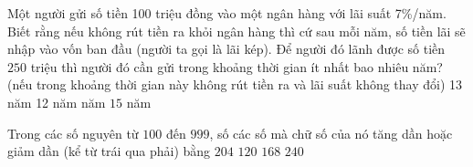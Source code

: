 \begin{ex}%
	Một người gửi số tiền 100 triệu đồng vào một ngân hàng với lãi suất 7\%/năm. Biết rằng nếu không rút tiền ra khỏi ngân hàng thì cứ sau mỗi năm, số tiền lãi sẽ nhập vào vốn ban đầu (người ta gọi là lãi kép). Để người đó lãnh được số tiền $250$ triệu thì người đó cần gửi trong khoảng thời gian ít nhất bao nhiêu năm? (nếu trong khoảng thời gian này không rút tiền ra và lãi suất không thay đổi)
	\choice
	{13 năm}
	{12 năm}	
	{ năm}
	{$15$ năm}
\end{ex}
\begin{ex}%
	Trong các số nguyên từ $100$ đến $999$, số các số mà chữ số của nó tăng dần hoặc giảm dần (kể từ trái qua phải) bằng
	\choice
	{\True $204$}
	{$120$}
	{$168$}
	{$240$}
\end{ex}

